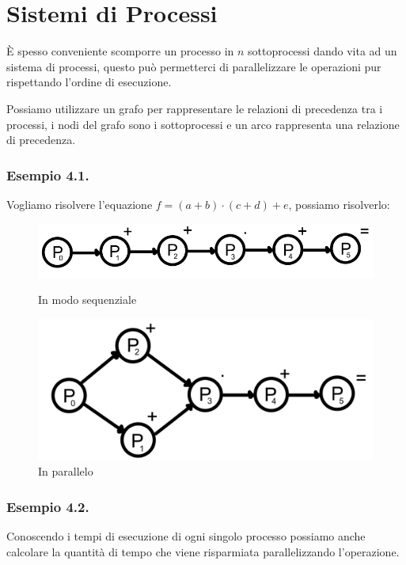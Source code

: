 \section{Sistemi di Processi}
È spesso conveniente scomporre un processo in $n$ sottoprocessi dando vita ad un sistema di processi, questo può permetterci di parallelizzare le operazioni pur rispettando l'ordine di esecuzione.

\begin{note}
    Possiamo utilizzare un grafo per rappresentare le relazioni di precedenza tra i processi, i nodi del grafo sono i sottoprocessi e un arco rappresenta una relazione di precedenza.
\end{note}

\subsubsection*{Esempio 4.1.}
Vogliamo risolvere l'equazione $f = (a + b) \cdot (c + d) + e$, possiamo risolverlo:
\begin{figure}[H]
    \centering
    \begin{minipage}{0.45\textwidth}
        \centering
        \includegraphics[width=\linewidth]{assets/math-sequenziale.jpeg}
        \caption{In modo sequenziale}
    \end{minipage}
    \hfill
    \begin{minipage}{0.35\textwidth}
        \centering
        \includegraphics[width=\linewidth]{assets/math-parallelo.jpeg}
        \caption{In parallelo}
    \end{minipage}
\end{figure}

\subsubsection*{Esempio 4.2.}
Conoscendo i tempi di esecuzione di ogni singolo processo possiamo anche calcolare la quantità di tempo che viene risparmiata parallelizzando l'operazione.

